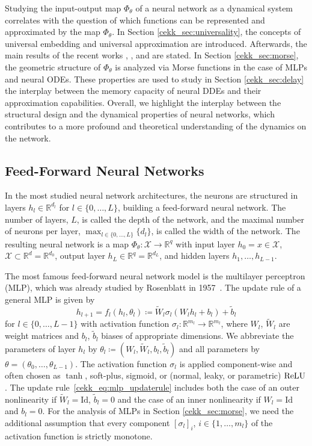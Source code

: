 \documentclass[10pt]{article}
\newcommand{\R}{{\mathbb R}}
\def\R{\mathbb{R}}
\begin{document}
Studying the input-output map $\Phi_\theta$ of a neural network as a dynamical system correlates with the question of which functions can be represented and approximated by the map $\Phi_\theta$. In Section \ref{cekk_sec:universality}, the concepts of universal embedding and universal approximation are introduced. Afterwards, the main results of the recent works \cite{KuehnKuntz2023}, \cite{KuehnKuntz2024}, and \cite{KuehnKuntz2025} are stated. In Section \ref{cekk_sec:morse}, the geometric structure of $\Phi_\theta$ is analyzed via Morse functions in the case of MLPs and neural ODEs. These properties are used to study in Section \ref{cekk_sec:delay} the interplay between the memory capacity of neural DDEs and their approximation capabilities. Overall, we highlight the interplay between the structural design and the dynamical properties of neural networks, which contributes to a more profound and theoretical understanding of the dynamics on the network. 

\subsection{Feed-Forward Neural Networks}
\label{cekk_sec:feedforward}


In the most studied neural network architectures, the neurons are structured in layers $h_l\in\R^{d_l}$ for $l\in\{0,\ldots,L\}$, building a feed-forward neural network. The number of layers, $L$, is called the depth of the network, and the maximal number of neurons per layer, $\max_{l\in\{0,\ldots,L\}}\{d_l\}$, is called the width of the network. The resulting neural network is a map $\Phi_\theta:\mathcal{X}\rightarrow \R^q$ with input layer $h_0 = x\in\mathcal{X}$, $\mathcal{X} \subset \R^d = \R^{d_0}$, output layer $h_L \in\R^{q} = \R^{d_L}$, and hidden layers $h_1,\ldots,h_{L-1}$. 

The most famous feed-forward neural network model is the multilayer perceptron  (MLP), which was already studied by Rosenblatt in 1957~\cite{Rosenblatt1957}. The update rule of  a general MLP is given by 
\begin{equation} \label{cekk_eq:mlp_updaterule}
	h_{l+1} = f_l(h_{l},\theta_l) \coloneqq \widetilde{W}_l\sigma_l(W_lh_{l}+b_l)+\tilde{b}_l 
\end{equation}
for $l \in \{0,\ldots,L-1\}$ with activation function $\sigma_l: \R^{m_l} \rightarrow \R^{m_l}$, where $W_l$, $\widetilde{W}_l$ are weight matrices and $b_l$, $\tilde{b}_l$ biases of appropriate dimensions. We abbreviate the parameters of layer $h_l$ by $\theta_l \coloneqq (W_l,\widetilde{W}_l,b_l,\tilde{b}_l)$ and all parameters by $\theta = (\theta_0,\ldots,\theta_{L-1})$. The activation function $\sigma_l$ is applied component-wise and often chosen as $\tanh$, soft-plus, sigmoid, or (normal, leaky, or parametric) $\textup{ReLU}$. The update rule~\eqref{cekk_eq:mlp_updaterule} includes both the case of an outer nonlinearity if $\widetilde{W}_l = \text{Id}$, $\tilde{b}_l = 0$ and the case of an inner nonlinearity if $W_l = \text{Id}$ and $b_l = 0$. For the analysis of MLPs in Section \ref{cekk_sec:morse}, we need the additional assumption that every component $[\sigma_l]_i$, $i \in \{1,\ldots,m_l\}$ of the activation function  is strictly monotone. 
\end{document}
